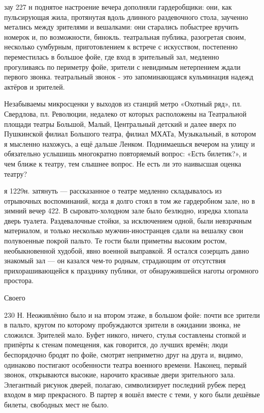зау 227 н поднятое настроение вечера дополняли гардеробщики: они, как пульсирующая жила, протянутая вдоль длинного раздевочного стола, заученно метались между зрителями и вешалками: они старались побыстрее вручить номерок и, по возможности, бинокль. театральная публика, разогретая своим, несколько сумбурным, приготовлением к встрече с искусством, постепенно переместилась в большое фойе, где вход в зрительный зал, медленно прогуливаясь по периметру фойе, зрители с невидимым нетерпением ждали первого звонка. театральный звонок - это запоминающаяся кульминация надежд актёров и зрителей.

Незабываемы микросценки у выходов из станций метро «Охотный ряд», пл. Свердлова, пл. Революции, недалеко от которых расположены на Театральной площади театры Большой, Малый, Центральный детский и далее вверх по Пушкинской филиал Большого театра, филиал МХАТа, Музыкальный, в котором я мысленно нахожусь, а ещё дальше Ленком. Поднимаешься вечером на улицу и обязательно услышишь многократно повторяемый вопрос: «Есть билетик?», и чем ближе к театру, тем слышнее вопрос. Не есть ли это наивысшая оценка театру?

я 1229н. затянуть — рассказанное о театре медленно складывалось из отрывочных воспоминаний, когда я долго стоял в том же гардеробном зале, но в зимний вечер 422. В сыровато-холодном зале было безлюдно, изредка хлопала дверь туалета. Раздевалочные стойки, за исключением одной, были невзрачным материалом, и только несколько мужчин-иностранцев сдали на вешалку свои полувоенные покрой пальто. Те гости были приметны высоким ростом, необыкновенной худобой, явно военной выправкой. Я остался созерцать давно знакомый зал — он казался чем-то родным, страдающим от отсутствия прихорашивающейся к празднику публики, от обнаружившейся наготы огромного простора.

Своего

230 Н.
Неоживлённо было и на втором этаже, в большом фойе: почти все зрители в пальто, кругом по которому пробуждаются зрители в ожидании звонка, не сложился. Зрителей мало. Буфет никого, ничего, стулья составлены стопкой и припёрты к стенам помещения, как говорится, до лучших времён; люди беспорядочно бродят по фойе, смотрят неприметно друг на друга и, видимо, одинаково постигают особенности театра военного времени. Наконец, первый звонок, открываются высокие, нарочито красивые двери зрительного зала. Элегантный рисунок дверей, полагаю, символизирует последний рубеж перед входом в мир прекрасного. В партер я вошёл вместе с теми, у кого были дешёвые билеты, свободных мест не было.

